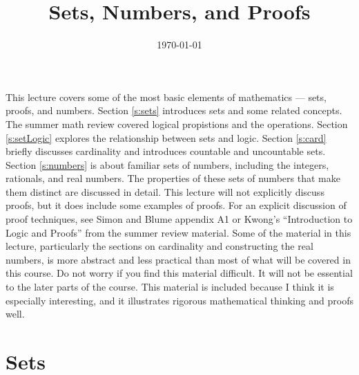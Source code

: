 \documentclass[12pt,reqno]{amsart}
\title{Sets, Numbers, and Proofs}
\date{\today}
\theoremstyle{definition}
\begin{document}
\maketitle
 
This lecture covers some of the most basic elements of mathematics ---
sets, proofs, and numbers. Section \ref{s:sets} introduces sets and
some related concepts. The summer math review covered logical
propistions and the operations. Section \ref{s:setLogic} explores the
relationship between sets and logic. Section \ref{s:card} briefly
discusses cardinality and introduces countable and uncountable
sets. Section \ref{s:numbers} is about familiar sets of numbers,
including the integers, rationals, and real numbers. The properties of
these sets of numbers that make them distinct are discussed in detail.
This lecture will not explicitly discuss proofs, but it does include
some examples of proofs. For an explicit discussion of proof
techniques, see Simon and Blume appendix A1 or Kwong's ``Introduction
to Logic and Proofs'' from the summer review material.  Some of the
material in this lecture, particularly the sections on cardinality and
constructing the real numbers, is more abstract and less practical
than most of what will be covered in this course. Do not worry if you
find this material difficult. It will not be essential to the later
parts of the course. This material is included because I think it is
especially interesting, and it illustrates rigorous mathematical
thinking and proofs well.

\section{Sets \label{s:sets}} 
\end{document}
